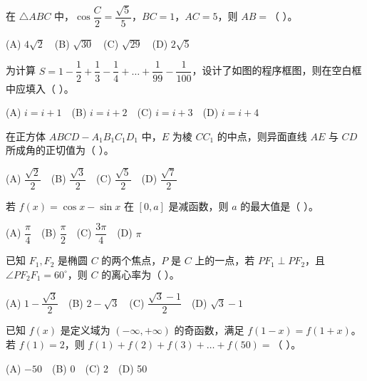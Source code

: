 \begin{question}
在 $\triangle ABC$ 中，$\cos\dfrac C2=\dfrac{\sqrt5}{5}$，$BC=1$，$AC=5$，则 $AB=$（ ）。

(A) $4\sqrt2$　(B) $\sqrt{30}$　(C) $\sqrt{29}$　(D) $2\sqrt5$

\Needspace{0.4\textheight}
\end{question}
\begin{question}
为计算 $S=1-\dfrac12+\dfrac13-\dfrac14+\dots+\dfrac{1}{99}-\dfrac{1}{100}$，设计了如图的程序框图，则在空白框中应填入（ ）。
\nopagebreak[4]
\begin{center}\end{center}
\nopagebreak[4]
(A) $i=i+1$　(B) $i=i+2$　(C) $i=i+3$　(D) $i=i+4$

\end{question}
\begin{question}
在正方体 $ABCD-A_1B_1C_1D_1$ 中，$E$ 为棱 $CC_1$ 的中点，则异面直线 $AE$ 与 $CD$ 所成角的正切值为（ ）。

(A) $\dfrac{\sqrt2}{2}$　(B) $\dfrac{\sqrt3}{2}$　(C) $\dfrac{\sqrt5}{2}$　(D) $\dfrac{\sqrt7}{2}$

\end{question}
\begin{question}
若 $f(x)=\cos x-\sin x$ 在 $[0,a]$ 是减函数，则 $a$ 的最大值是（ ）。

(A) $\dfrac\pi4$　(B) $\dfrac\pi2$　(C) $\dfrac{3\pi}{4}$　(D) $\pi$

\end{question}
\begin{question}
已知 $F_1,F_2$ 是椭圆 $C$ 的两个焦点，$P$ 是 $C$ 上的一点，若 $PF_1\perp PF_2$，且 $\angle PF_2F_1=60^\circ$，则 $C$ 的离心率为（ ）。

(A) $1-\dfrac{\sqrt3}{2}$　(B) $2-\sqrt3$　(C) $\dfrac{\sqrt3-1}{2}$　(D) $\sqrt3-1$

\end{question}
\begin{question}
已知 $f(x)$ 是定义域为 $(-\infty,+\infty)$ 的奇函数，满足 $f(1-x)=f(1+x)$。若 $f(1)=2$，则 $f(1)+f(2)+f(3)+\dots+f(50)=$（ ）。

(A) $-50$　(B) 0　(C) 2　(D) 50

\end{question}

